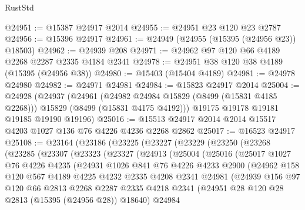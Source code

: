 \begin{lexlean}{RustStd}
\begin{coremodule}
@24951 := @15387 @24917 @2014
@24955 := @24951 @23 @120 @23 @2787
@24956 := @15396 @24917
@24961 := @24949 (@24955 (@15395 (@24956 @23)) @18503)
@24962 := @24939 @208
@24971 := @24962 @97 @120 @66 @4189 @2268 @2287 @2335 @4184 @2341
@24978 := @24951 @38 @120 @38 @4189 (@15395 (@24956 @38))
@24980 := @15403 (@15404 @4189)
@24981 := @24978 @24980
@24982 := @24971 @24981
@24984 := @15823 @24917 @2014
@25004 := @24928
    (@24937
      (@24961
        (@24982 @24984 @15829 (@8499 (@15831 @4185 @2268)))
        @15829
        (@8499 (@15831 @4175 @4192)))
      @19175
      @19178
      @19181
      @19185
      @19190
      @19196)
@25016 := @15513 @24917 @2014 @2014 @15517 @4203 @1027 @136 @76 @4226 @4236 @2268 @2862
@25017 := @16523 @24917
@25108 := @23164
    (@23186
      (@23225
        (@23227
          (@23229
            (@23250
              (@23268
                (@23285
                  (@23307
                    (@23323
                      (@23327
                        (@24913
                          (@25004
                            (@25016
                              (@25017
                                @1027
                                @76
                                @4226
                                @4235
                                (@24931
                                  @1026
                                  @841
                                  @76
                                  @4226
                                  @4233
                                  @2900
                                  (@24962
                                    @158
                                    @120
                                    @567
                                    @4189
                                    @4225
                                    @4232
                                    @2335
                                    @4208
                                    @2341
                                    @24981
                                    (@24939
                                      @156
                                      @97
                                      @120
                                      @66
                                      @2813
                                      @2268
                                      @2287
                                      @2335
                                      @4218
                                      @2341
                                      (@24951 @28 @120 @28 @2813 (@15395 (@24956 @28)) @18640)
                                      @24984

\end{coremodule}
\end{lexlean}
